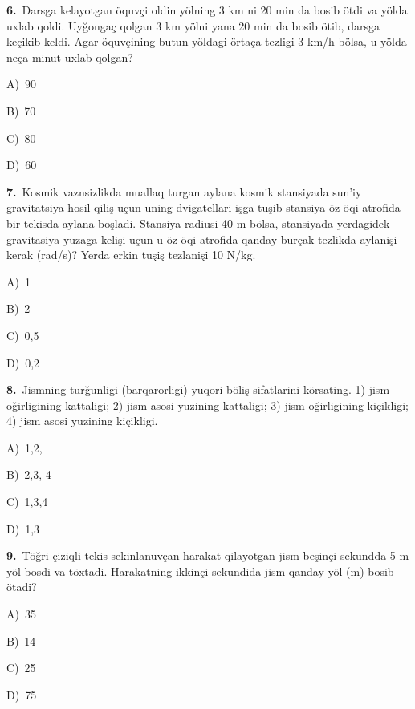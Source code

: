\documentclass[11pt,a4paper]{article}
\newcommand{\opt}[2]{\hspace*{4mm}#1)\ #2\par}
\begin{document}
\noindent\begin{minipage}{\linewidth}
\textbf{6.}\ Darsga kelayotgan öquvçi oldin yölning 3 km ni 20 min da bosib ötdi va yölda uxlab qoldi. Uyğongaç qolgan 3 km yölni yana 20 min da bosib ötib, darsga keçikib keldi. Agar öquvçining butun yöldagi örtaça tezligi 3 km/h bölsa, u yölda neça minut uxlab qolgan?\par\smallskip
\opt{A}{90}
\opt{B}{70}
\opt{C}{80}
\opt{D}{60}
\end{minipage}\vspace{9pt}\par
\noindent\begin{minipage}{\linewidth}
\textbf{7.}\ Kosmik vaznsizlikda muallaq turgan aylana kosmik stansiyada sun’iy gravitatsiya hosil qiliş uçun uning dvigatellari işga tuşib stansiya öz öqi atrofida bir tekisda aylana boşladi. Stansiya radiusi 40 m bölsa, stansiyada yerdagidek gravitasiya yuzaga kelişi uçun u öz öqi atrofida qanday burçak tezlikda aylanişi kerak (rad/s)? Yerda erkin tuşiş tezlanişi 10 N/kg.\par\smallskip
\opt{A}{1}
\opt{B}{2}
\opt{C}{0,5}
\opt{D}{0,2}
\end{minipage}\vspace{9pt}\par
\noindent\begin{minipage}{\linewidth}
\textbf{8.}\ Jismning turğunligi (barqarorligi) yuqori böliş sifatlarini körsating. 1) jism oğirligining kattaligi; 2) jism asosi yuzining kattaligi; 3) jism oğirligining kiçikligi; 4) jism asosi yuzining kiçikligi.\par\smallskip
\opt{A}{1,2,}
\opt{B}{2,3, 4}
\opt{C}{1,3,4}
\opt{D}{1,3}
\end{minipage}\vspace{9pt}\par
\noindent\begin{minipage}{\linewidth}
\textbf{9.}\ Töğri çiziqli tekis sekinlanuvçan harakat qilayotgan jism beşinçi sekundda 5 m yöl bosdi va töxtadi. Harakatning ikkinçi sekundida jism qanday yöl (m) bosib ötadi?\par\smallskip
\opt{A}{35}
\opt{B}{14}
\opt{C}{25}
\opt{D}{75}
\end{minipage}\vspace{9pt}\par
\end{document}
